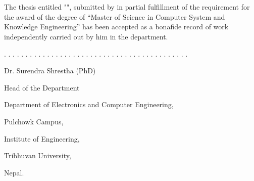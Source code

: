\doublespacing
\iffalse

\chapter*{Recommendation}

The undersigned certify that they have read and recommended to the Department of Electronics and Computer Engineering for acceptance, a thesis entitled “\textit{\thetitle}”, submitted by {\theauthor} in partial fulfillment of the requirement for the award of the degree of “Master of Science in Computer System and Knowledge Engineering.

\vspace{3cm}
..........................................

Supervisor

Dr. Surendra Shrestha (PhD)

\vspace{3cm}


..........................................

External Examiner

Name:








\fi

\chapter*{}
\vspace{2.6cm}

The thesis entitled "\thetitle", submitted by {\theauthor} in partial fulfillment of the requirement for the award of the degree of “Master of Science in Computer System and Knowledge Engineering” has been accepted as a bonafide record of work independently carried out by him in the department.


\vspace{3cm}
. . . . . . . . . . . . . . . . . . . . . . . . . . . . . . . . . . . . . . . . . . . 

Dr. Surendra Shrestha (PhD)

Head of the Department

Department of Electronics and Computer Engineering,

Pulchowk Campus,

Institute of Engineering,

Tribhuvan University,

Nepal.

